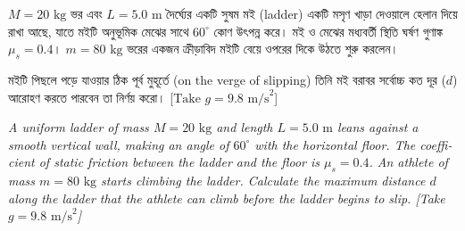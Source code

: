 \documentclass[12pt, a4paper]{article}
\begin{document}
\begin{tcolorbox}[questionbox={প্রশ্ন(Question)20 }]
\noindent
$M = 20\text{ kg}$ ভর এবং $L = 5.0\text{ m}$ দৈর্ঘ্যের একটি সুষম মই (ladder) একটি মসৃণ খাড়া দেওয়ালে হেলান দিয়ে রাখা আছে, যাতে মইটি অনুভূমিক মেঝের সাথে $60^\circ$ কোণ উৎপন্ন করে। মই ও মেঝের মধ্যবর্তী স্থিতি ঘর্ষণ গুণাঙ্ক $\mu_s = 0.4$। $m = 80\text{ kg}$ ভরের একজন ক্রীড়াবিদ মইটি বেয়ে ওপরের দিকে উঠতে শুরু করলেন। 

\vspace{0.3em}
\noindent
মইটি পিছলে পড়ে যাওয়ার ঠিক পূর্ব মুহূর্তে (on the verge of slipping) তিনি মই বরাবর সর্বোচ্চ কত দূর ($d$) আরোহণ করতে পারবেন তা নির্ণয় করো। [$\text{Take } g = 9.8\text{ m/s}^2$]

\vspace{0.8em}
\begin{english}
\noindent\textit{\color{darkgray}
A uniform ladder of mass $M = 20\text{ kg}$ and length $L = 5.0\text{ m}$ leans against a smooth vertical wall, making an angle of $60^\circ$ with the horizontal floor. The coefficient of static friction between the ladder and the floor is $\mu_s = 0.4$. An athlete of mass $m = 80\text{ kg}$ starts climbing the ladder. Calculate the maximum distance $d$ along the ladder that the athlete can climb before the ladder begins to slip. [Take $g = 9.8\text{ m/s}^2$]
}
\end{english}
\end{tcolorbox}
\end{document}
